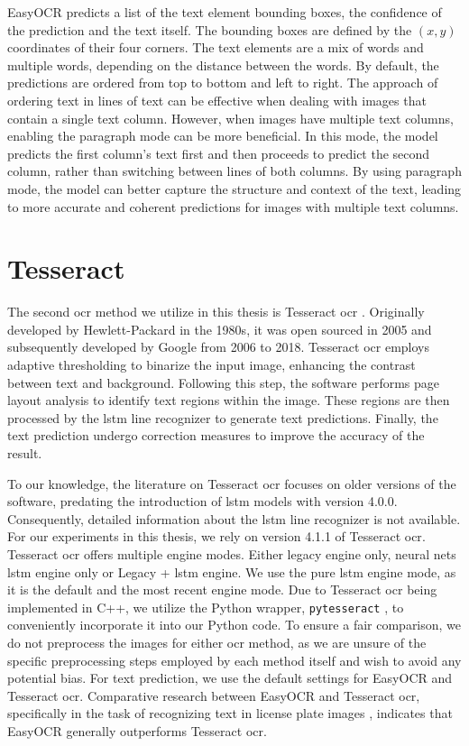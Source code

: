 EasyOCR predicts a list of the text element bounding boxes, the confidence of the prediction and the text itself.
The bounding boxes are defined by the $(x, y)$ coordinates of their four corners.
The text elements are a mix of words and multiple words, depending on the distance between the words.
By default, the predictions are ordered from top to bottom and left to right.
The approach of ordering text in lines of text can be effective when dealing with images that contain a single text column.
However, when images have multiple text columns, enabling the paragraph mode can be more beneficial.
In this mode, the model predicts the first column's text first and then proceeds to predict the second column, rather than switching between lines of both columns.
By using paragraph mode, the model can better capture the structure and context of the text, leading to more accurate and coherent predictions for images with multiple text columns.


\section{Tesseract}
\label{subsec:tesseract}

The second \gls{ocr} method we utilize in this thesis is Tesseract \gls{ocr} \cite{tesseract_legacy_2007}\cite{tesseract_github_2023}\cite{tesseract_architecture_2016}.
Originally developed by Hewlett-Packard in the 1980s, it was open sourced in 2005 and subsequently developed by Google from 2006 to 2018.
Tesseract \gls{ocr} employs adaptive thresholding to binarize the input image, enhancing the contrast between text and background.
Following this step, the software performs page layout analysis to identify text regions within the image.
These regions are then processed by the \gls{lstm} line recognizer to generate text predictions.
Finally, the text prediction undergo correction measures to improve the accuracy of the result.

To our knowledge, the literature on Tesseract \gls{ocr} focuses on older versions of the software, predating the introduction of \gls{lstm} models with version 4.0.0.
Consequently, detailed information about the \gls{lstm} line recognizer is not available.
For our experiments in this thesis, we rely on version 4.1.1 of Tesseract \gls{ocr}.
Tesseract \gls{ocr} offers multiple engine modes.
Either legacy engine only, neural nets \gls{lstm} engine only or Legacy + \gls{lstm} engine.
We use the pure \gls{lstm} engine mode, as it is the default and the most recent engine mode.
Due to Tesseract \gls{ocr} being implemented in C++, we utilize the Python wrapper, \texttt{pytesseract} \cite{pytesseract_2022}, to conveniently incorporate it into our Python code.
To ensure a fair comparison, we do not preprocess the images for either \gls{ocr} method, as we are unsure of the specific preprocessing steps employed by each method itself and wish to avoid any potential bias.
For text prediction, we use the default settings for EasyOCR and Tesseract \gls{ocr}.
Comparative research between EasyOCR and Tesseract \gls{ocr}, specifically in the task of recognizing text in license plate images \cite{ocr_tess_vs_easyocr_2022}, indicates that EasyOCR generally outperforms Tesseract \gls{ocr}.

